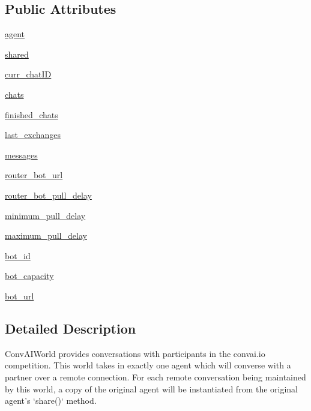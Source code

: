 \subsection*{Public Attributes}
\begin{DoxyCompactItemize}
\item 
\hyperlink{classconvai_1_1convai__world_1_1ConvAIWorld_a652682be0f17ea53bd8813cbcccfc48e}{agent}
\item 
\hyperlink{classconvai_1_1convai__world_1_1ConvAIWorld_a696e5f81b80096555aec418806b405dc}{shared}
\item 
\hyperlink{classconvai_1_1convai__world_1_1ConvAIWorld_afce195675ca3a29b4839c97f1e33a844}{curr\+\_\+chat\+ID}
\item 
\hyperlink{classconvai_1_1convai__world_1_1ConvAIWorld_a080dcf6d50b6dca93728920037160c92}{chats}
\item 
\hyperlink{classconvai_1_1convai__world_1_1ConvAIWorld_acfb760dc6321d52756599e95536a7c60}{finished\+\_\+chats}
\item 
\hyperlink{classconvai_1_1convai__world_1_1ConvAIWorld_a49433da97f94491714d90100c86898c9}{last\+\_\+exchanges}
\item 
\hyperlink{classconvai_1_1convai__world_1_1ConvAIWorld_a3e0255a2e29d541779965e578ceac3d4}{messages}
\item 
\hyperlink{classconvai_1_1convai__world_1_1ConvAIWorld_a050d8bc8dbfb6917c7256cad5e305bb8}{router\+\_\+bot\+\_\+url}
\item 
\hyperlink{classconvai_1_1convai__world_1_1ConvAIWorld_a8605962b2033aebf6dd704cb455e0d4c}{router\+\_\+bot\+\_\+pull\+\_\+delay}
\item 
\hyperlink{classconvai_1_1convai__world_1_1ConvAIWorld_a4f9a9b3eec05d4675fde37a2ce34ccf9}{minimum\+\_\+pull\+\_\+delay}
\item 
\hyperlink{classconvai_1_1convai__world_1_1ConvAIWorld_ab4994378bbb8e66f5d0959ae0b1dd0a4}{maximum\+\_\+pull\+\_\+delay}
\item 
\hyperlink{classconvai_1_1convai__world_1_1ConvAIWorld_a1fe42a4c94232ba48fc7e6c5c1f3c431}{bot\+\_\+id}
\item 
\hyperlink{classconvai_1_1convai__world_1_1ConvAIWorld_a3104a1612811c3895fb28ab763fec11a}{bot\+\_\+capacity}
\item 
\hyperlink{classconvai_1_1convai__world_1_1ConvAIWorld_a7e8b98500d56ccfa435145a331050dae}{bot\+\_\+url}
\end{DoxyCompactItemize}


\subsection{Detailed Description}
\begin{DoxyVerb}ConvAIWorld provides conversations with participants in the convai.io
competition.
This world takes in exactly one agent which will converse with a partner
over a remote connection.
For each remote conversation being maintained by this world, a copy of the
original agent will be instantiated from the original agent's `share()`
method.
\end{DoxyVerb}
 

